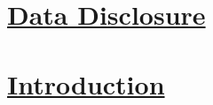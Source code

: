 



\newpage
\section{\underline{Data Disclosure}}




\newpage
\section{\underline{Introduction}}




\newpage



\newpage








\newpage







